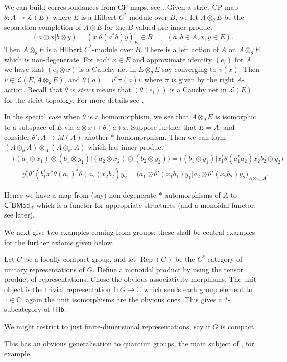 \documentclass[a4paper,11pt]{article}
\theoremstyle{plain}
\theoremstyle{remark}
\newenvironment{example}
  {\pushQED{\qed}\renewcommand{\qedsymbol}{$\triangle$}\examplex}
  {\popQED\endexamplex}
\newcommand{\mc}[1]{\mathcal{#1}}
\newcommand{\catHilb}{\textsf{Hilb}}
\newcommand{\Rep}{\operatorname{Rep}}
\newcommand{\catHCStarBi}[1]{\textsf{C$^*$BMod}_{#1}}
\begin{document}
\begin{example}
We can build correspondances from CP maps, see \cite[Chapter~5]{Lance_HilbModsBook}.  Given a strict CP map $\theta \colon A \to \mc L(E)$ where $E$ is a Hilbert $C^*$-module over $B$, we let $A \otimes_\theta E$ be the separation completion of $A\otimes E$ for the $B$-valued pre-inner-product
\[ (a\otimes x|b\otimes y) = (x|\theta(a^*b)y)_E \in B \qquad (a,b\in A, x,y\in E). \]
Then $A\otimes_\theta E$ is a Hilbert $C^*$-module over $B$.  There is a left action of $A$ on $A\otimes_\theta E$ which is non-degenerate.  For each $x\in E$ and approximate identity $(e_i)$ for $A$ we have that $(e_i\otimes x)$ is a Cauchy net in $E\otimes_\theta E$ say converging to $v(x)$.  Then $v\in\mc L(E,A\otimes_\theta E)$, and $\theta(a) = v^*\pi(a)v$ where $\pi$ is given by the right $A$-action.  Recall that $\theta$ is \emph{strict} means that $(\theta(e_i))$ is a Cauchy net in $\mc L(E)$ for the strict topology.  For more details see \cite[Theorem~5.6]{Lance_HilbModsBook}.

In the special case when $\theta$ is a homomorphism, we see that $A\otimes_\theta E$ is isomorphic to a subspace of $E$ via $a\otimes x\mapsto \theta(a)x$.  Suppose further that $E=A$, and consider $\theta' \colon A \to M(A)$ another $*$-homomorphism.  Then we can form $(A\otimes_\theta A)\otimes_A(A\otimes_{\theta'}A)$ which has inner-product
\begin{align*}
& \bigl( (a_1\otimes x_1)\otimes(b_1\otimes y_1) \big| (a_2\otimes x_2)\otimes(b_2\otimes y_2) \bigr)
= \bigl( (b_1\otimes y_1) \big| x_1^* \theta(a_1^*a_2) x_2 b_2\otimes y_2 \bigr)  \\
&= y_1^* \theta'( b_1^* x_1^* \theta(a_1)^* \theta(a_2) x_2 b_2 ) y_2
= \bigl( a_1 \otimes \theta'(x_1b_1)y_1 \big| a_2 \otimes \theta'(x_2b_2)y_2 \bigr)_{A\otimes_{\theta'\theta}A}.
\end{align*}

Hence we have a map from (say) non-degenerate $*$-automorphisms of $A$ to $\catHCStarBi{A}$ which is a functor for appropriate structures (and a monoidal functor, see later).
\end{example}

We next give two examples coming from groups: these shall be central examples for the further axioms given below.

\begin{example}
Let $G$ be a locally compact group, and let $\Rep(G)$ be the $C^*$-category of unitary representations of $G$.  Define a monoidal product by using the tensor product of representations.  Chose the obvious associativity morphisms.  The unit object is the trivial representation $1 \colon G \to \mathbb C$ which sends each group element to $1\in\mathbb C$; again the unit isomorphisms are the obvious ones.  This gives a $*$-subcategory of $\catHilb$.

We might restrict to just finite-dimensional representations, say if $G$ is compact.

This has an obvious generalisation to quantum groups, the main subject of \cite{NT_CQGsBook}, for example.
\end{example}
\end{document}
